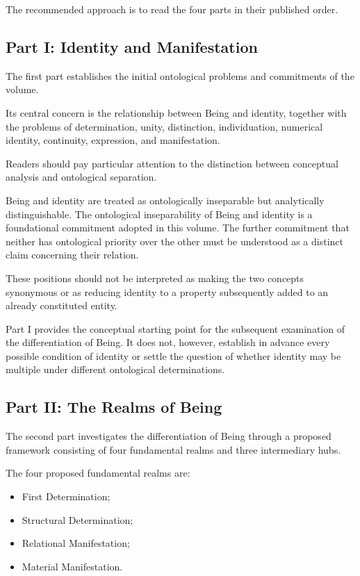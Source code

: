 The recommended approach is to read the four parts
in their published order.

\subsection*{Part I: Identity and Manifestation}

The first part establishes the initial ontological
problems and commitments of the volume.

Its central concern is the relationship between
Being and identity, together with the problems
of determination, unity, distinction, individuation,
numerical identity, continuity, expression, and
manifestation.

Readers should pay particular attention to the
distinction between conceptual analysis and
ontological separation.

Being and identity are treated as ontologically
inseparable but analytically distinguishable.
The ontological inseparability of Being and identity
is a foundational commitment adopted in this volume.
The further commitment that neither has ontological
priority over the other must be understood as a
distinct claim concerning their relation.

These positions should not be interpreted as
making the two concepts synonymous or as reducing
identity to a property subsequently added to an
already constituted entity.

Part I provides the conceptual starting point
for the subsequent examination of the differentiation
of Being. It does not, however, establish in advance
every possible condition of identity or settle
the question of whether identity may be multiple
under different ontological determinations.

\subsection*{Part II: The Realms of Being}

The second part investigates the differentiation
of Being through a proposed framework consisting
of four fundamental realms and three intermediary
hubs.

The four proposed fundamental realms are:

\begin{itemize}
    \item First Determination;
    \item Structural Determination;
    \item Relational Manifestation;
    \item Material Manifestation.
\end{itemize}

